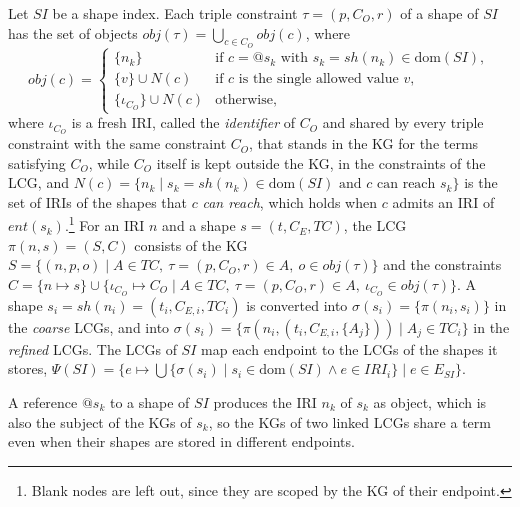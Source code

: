 \begin{definition}\label{def:summary}
Let $SI$ be a shape index.
Each triple constraint $\tau = (p, C_O, r)$ of a shape of $SI$ has the set of objects $\mathit{obj}(\tau) = \bigcup_{c \in C_O} \mathit{obj}(c)$, where
\[
  \mathit{obj}(c) =
  \begin{cases}
    \{ n_k \} & \text{if } c = @s_k \text{ with } s_k = \mathit{sh}(n_k) \in \mathrm{dom}(SI), \\
    \{ v \} \cup N(c) & \text{if } c \text{ is the single allowed value } v, \\
    \{ \iota_{C_O} \} \cup N(c) & \text{otherwise},
  \end{cases}
\]
where $\iota_{C_O}$ is a fresh \ac{IRI}, called the \emph{identifier} of $C_O$ and shared by every triple constraint with the same constraint $C_O$, that stands in the \ac{KG} for the terms satisfying $C_O$, while $C_O$ itself is kept outside the \ac{KG}, in the constraints of the \ac{LCG},
and $N(c) = \{ n_k \mid s_k = \mathit{sh}(n_k) \in \mathrm{dom}(SI) \text{ and } c \text{ can reach } s_k \}$ is the set of \acp{IRI} of the shapes that $c$ \emph{can reach},
which holds when $c$ admits an \ac{IRI} of $\mathit{ent}(s_k)$.\footnote{Blank nodes are left out, since they are scoped by the \ac{KG} of their endpoint.}
For an \ac{IRI} $n$ and a shape $s = (t, C_E, \mathit{TC})$, the \ac{LCG} $\pi(n, s) = (S, C)$ consists of the \ac{KG}
$S = \{ (n, p, o) \mid A \in \mathit{TC},\ \tau = (p, C_O, r) \in A,\ o \in \mathit{obj}(\tau) \}$
and the constraints $C = \{ n \mapsto s \} \cup \{ \iota_{C_O} \mapsto C_O \mid A \in \mathit{TC},\ \tau = (p, C_O, r) \in A,\ \iota_{C_O} \in \mathit{obj}(\tau) \}$.
A shape $s_i = \mathit{sh}(n_i) = (t_i, C_{E,i}, \mathit{TC}_i)$ is converted into $\sigma(s_i) = \{ \pi(n_i, s_i) \}$ in the \emph{coarse} \acsp{LCG},
and into $\sigma(s_i) = \{ \pi(n_i, (t_i, C_{E,i}, \{ A_j \})) \mid A_j \in \mathit{TC}_i \}$ in the \emph{refined} \acsp{LCG}.
The \acp{LCG} of $SI$ map each endpoint to the \acp{LCG} of the shapes it stores,
$\Psi(SI) = \{ e \mapsto \bigcup \{ \sigma(s_i) \mid s_i \in \mathrm{dom}(SI) \land e \in \mathit{IRI}_i \} \mid e \in E_{SI} \}$.
\end{definition}

A reference $@s_k$ to a shape of $SI$ produces the \ac{IRI} $n_k$ of $s_k$ as object, which is also the subject of the \acp{KG} of $s_k$,
so the \acp{KG} of two linked \acp{LCG} share a term even when their shapes are stored in different endpoints.

